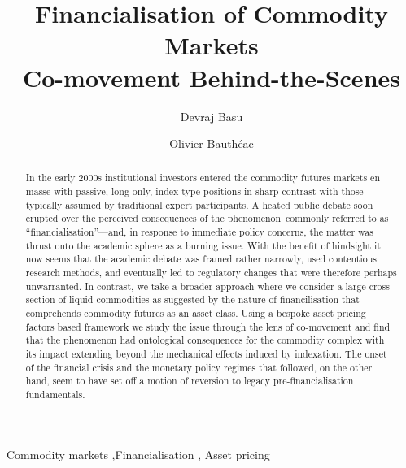 \documentclass[
  authoryear,
  preprint,
  3p]{elsarticle}
\begin{document}
\begin{frontmatter}
\title{Financialisation of Commodity Markets \\\large{Co-movement
Behind-the-Scenes} }
\author[1]{Devraj Basu%
%
}
\author[1]{Olivier Bauthéac%
%
}




        
\begin{abstract}
In the early 2000s institutional investors entered the commodity futures
markets en masse with passive, long only, index type positions in sharp
contrast with those typically assumed by traditional expert
participants. A heated public debate soon erupted over the perceived
consequences of the phenomenon--commonly referred to as
``financialisation''---and, in response to immediate policy concerns,
the matter was thrust onto the academic sphere as a burning issue. With
the benefit of hindsight it now seems that the academic debate was
framed rather narrowly, used contentious research methods, and
eventually led to regulatory changes that were therefore perhaps
unwarranted. In contrast, we take a broader approach where we consider a
large cross-section of liquid commodities as suggested by the nature of
financilisation that comprehends commodity futures as an asset class.
Using a bespoke asset pricing factors based framework we study the issue
through the lens of co-movement and find that the phenomenon had
ontological consequences for the commodity complex with its impact
extending beyond the mechanical effects induced by indexation. The onset
of the financial crisis and the monetary policy regimes that followed,
on the other hand, seem to have set off a motion of reversion to legacy
pre-financialisation fundamentals.
\end{abstract}





\begin{keyword}
    Commodity markets \sep Financialisation \sep 
    Asset pricing
\end{keyword}
\end{frontmatter}
    

\newpage
\end{document}
